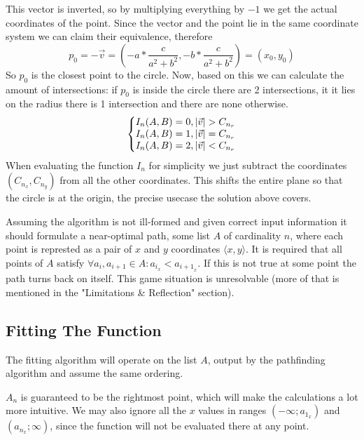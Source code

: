 \documentclass[12pt, titlepage]{article}
\begin{document}
This vector is inverted, so by multiplying everything by $-1$ we get the actual 
coordinates of the point. Since the vector and the point lie in the same coordinate
system we can claim their equivalence, therefore
\begin{equation}
    p_0 = -\vec{v} = (-a * \frac{c}{a^2 + b^2}, -b * \frac{c}{a^2 + b^2}) = (x_0, y_0)
\end{equation}
So $p_0$ is the closest point to the circle.
Now, based on this we can calculate the amount of intersections: if $p_0$ is inside
the circle there are 2 intersections, it it lies on the radius there is 1 intersection
and there are none otherwise.
\begin{equation}
    \left\{\begin{array}{@{}l@{}}
       I_n(A, B) = 0, |\vec{v}| > C_{n_r}\\
       I_n(A, B) = 1, |\vec{v}| = C_{n_r}\\
       I_n(A, B) = 2, |\vec{v}| < C_{n_r}
    \end{array}\right.
\end{equation}
When evaluating the function $I_n$ for simplicity we just subtract the 
coordinates $(C_{n_x}, C_{n_y})$ from all the other coordinates. This shifts 
the entire plane so that the circle is at the origin, the precise usecase the
solution above covers.

Assuming the algorithm is not ill-formed and given correct input information
it should formulate a near-optimal path, some list $A$ of cardinality $n$, 
where each point is represted as  a pair of $x$ and $y$ coordinates 
$\langle x, y \rangle$. It is required that all points of $A$ satisfy 
$\forall a_i,a_{i+1} \in A : a_{i_x} < a_{{i+1}_x}$. If this is not true 
at some point the path turns back on itself. This game situation is unresolvable 
(more of that is mentioned in the "Limitations \& Reflection" section).

\subsection{Fitting The Function}

The fitting algorithm will operate on the list $A$, output by the 
pathfinding algorithm and assume the same ordering.

$A_n$ is guaranteed to be the rightmost point, which
will make the calculations a lot more intuitive.
We may also ignore all the $x$ values in ranges 
$(-\infty; a_{1_x})$ and $(a_{n_x}; \infty)$, since the function will not be 
evaluated there at any point.
\end{document}
